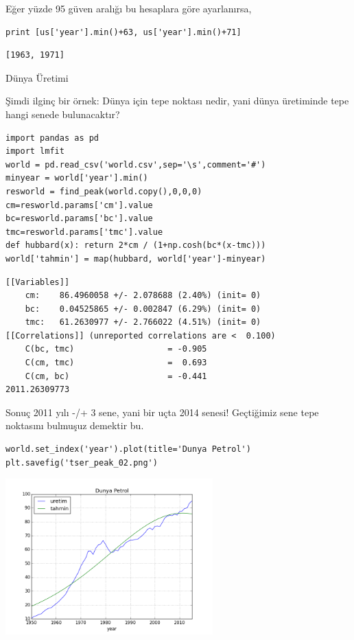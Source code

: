 \documentclass[12pt,fleqn]{article}\usepackage{../../common}
\begin{document}
Eğer yüzde 95 güven aralığı bu hesaplara göre ayarlanırsa, 

\begin{verbatim}
print [us['year'].min()+63, us['year'].min()+71]
\end{verbatim}

\begin{verbatim}
[1963, 1971]
\end{verbatim}

Dünya Üretimi

Şimdi ilginç bir örnek: Dünya için tepe noktası nedir, yani dünya üretiminde
tepe hangi senede bulunacaktır?

\begin{verbatim}
import pandas as pd
import lmfit
world = pd.read_csv('world.csv',sep='\s',comment='#')
minyear = world['year'].min()
resworld = find_peak(world.copy(),0,0,0)
cm=resworld.params['cm'].value
bc=resworld.params['bc'].value
tmc=resworld.params['tmc'].value
def hubbard(x): return 2*cm / (1+np.cosh(bc*(x-tmc))) 
world['tahmin'] = map(hubbard, world['year']-minyear)
\end{verbatim}

\begin{verbatim}
[[Variables]]
    cm:    86.4960058 +/- 2.078688 (2.40%) (init= 0)
    bc:    0.04525865 +/- 0.002847 (6.29%) (init= 0)
    tmc:   61.2630977 +/- 2.766022 (4.51%) (init= 0)
[[Correlations]] (unreported correlations are <  0.100)
    C(bc, tmc)                   = -0.905 
    C(cm, tmc)                   =  0.693 
    C(cm, bc)                    = -0.441 
2011.26309773
\end{verbatim}

Sonuç 2011 yılı -/+ 3 sene, yani bir uçta 2014 senesi! Geçtiğimiz sene tepe
noktasını bulmuşuz demektir bu. 

\begin{verbatim}
world.set_index('year').plot(title='Dunya Petrol')
plt.savefig('tser_peak_02.png')
\end{verbatim}

\includegraphics[height=6cm]{tser_peak_02.png}
\end{document}
